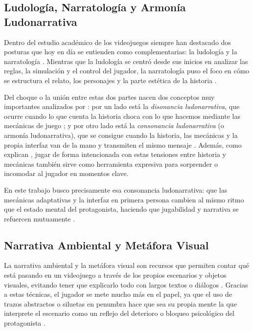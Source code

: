 \subsection{Ludología, Narratología y Armonía Ludonarrativa}
Dentro del estudio académico de los videojuegos siempre han destacado dos posturas que hoy en día se entienden como complementarias: la ludología y la narratología \parencite{finestrat2018, hernandez2024}. Mientras que la ludología se centró desde sus inicios en analizar las reglas, la simulación y el control del jugador, la narratología puso el foco en cómo se estructura el relato, los personajes y la parte estética de la historia \parencite{cuadrado2020, gomez2026}.

Del choque o la unión entre estas dos partes nacen dos conceptos muy importantes analizados por \textcite{hernandez2024}: por un lado está la \textit{disonancia ludonarrativa}, que ocurre cuando lo que cuenta la historia choca con lo que hacemos mediante las mecánicas de juego \parencite{gomez2026, hernandez2024}; y por otro lado está la \textit{consonancia ludonarrativa} (o armonía ludonarrativa), que se consigue cuando la historia, las mecánicas y la propia interfaz van de la mano y transmiten el mismo mensaje \parencite{hernandez2024}. Además, como explican \textcite{hernandez2024}, jugar de forma intencionada con estas tensiones entre historia y mecánicas también sirve como herramienta expresiva para sorprender o incomodar al jugador en momentos clave.

En este trabajo busco precisamente esa consonancia ludonarrativa: que las mecánicas adaptativas y la interfaz en primera persona cambien al mismo ritmo que el estado mental del protagonista, haciendo que jugabilidad y narrativa se refuercen mutuamente \parencite{hernandez2024}.

\subsection{Narrativa Ambiental y Metáfora Visual}
La narrativa ambiental y la metáfora visual son recursos que permiten contar qué está pasando en un videojuego a través de los propios escenarios y objetos visuales, evitando tener que explicarlo todo con largos textos o diálogos \parencite{finestrat2018, boyero2025}. Gracias a estas técnicas, el jugador se mete mucho más en el papel, ya que el uso de trazos abstractos o siluetas en penumbra hace que sea su propia mente la que interprete el escenario como un reflejo del deterioro o bloqueo psicológico del protagonista \parencite{boyero2025}.

